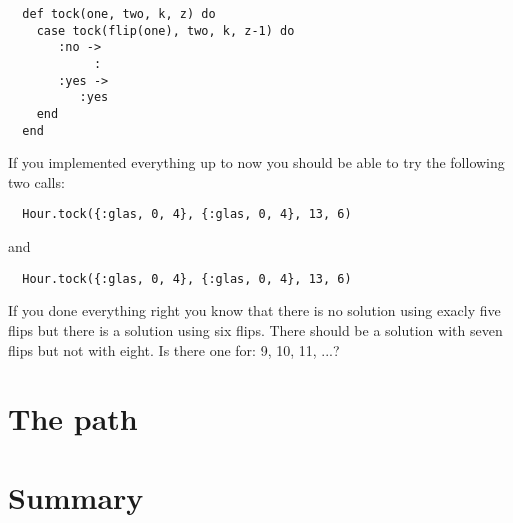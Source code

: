 \documentclass[a4paper,11pt]{article}
\begin{document}
\begin{verbatim}
  def tock(one, two, k, z) do
    case tock(flip(one), two, k, z-1) do 
       :no ->
            :
       :yes ->
          :yes     
    end
  end 
\end{verbatim}

If you implemented everything up to now you should be able to try the
following two calls:

\begin{verbatim}
  Hour.tock({:glas, 0, 4}, {:glas, 0, 4}, 13, 6)
\end{verbatim}
and
\begin{verbatim}
  Hour.tock({:glas, 0, 4}, {:glas, 0, 4}, 13, 6)
\end{verbatim}

If you done everything right you know that there is no solution using
exacly five flips but there is a solution using six flips. There
should be a solution with seven flips but not with eight. Is there one
for: 9, 10, 11, ...?

\section*{The path}








\section*{Summary}


  
\end{document}
